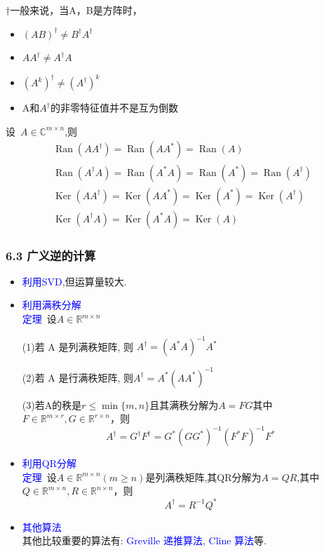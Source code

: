 \documentclass[notheorems,serif]{beamer}
\begin{document}
\begin{frame}
$\dagger$一般来说，当A，B是方阵时，
\begin{itemize}
	\item $(A B)^{\dagger} \neq B^{\dagger} A^{\dagger}$
	\item $A A^{\dagger} \neq A^{\dagger} A$
	\item $\left(A^{k}\right)^{\dagger} \neq\left(A^{\dagger}\right)^{k}$
	\item A和$A^{\dagger}$的非零特征值并不是互为倒数
\end{itemize}
设~$A \in \mathbb{C}^{m \times n}$,则
$$
\begin{array}{l}{\operatorname{Ran}\left(A A^{\dagger}\right)=\operatorname{Ran}\left(A A^{*}\right)=\operatorname{Ran}(A)} \\ {\operatorname{Ran}\left(A^{\dagger} A\right)=\operatorname{Ran}\left(A^{*} A\right)=\operatorname{Ran}\left(A^{*}\right)=\operatorname{Ran}\left(A^{\dagger}\right)} \\ {\operatorname{Ker}\left(A A^{\dagger}\right)=\operatorname{Ker}\left(A A^{*}\right)=\operatorname{Ker}\left(A^{*}\right)=\operatorname{Ker}\left(A^{\dagger}\right)} \\ {\operatorname{Ker}\left(A^{\dagger} A\right)=\operatorname{Ker}\left(A^{*} A\right)=\operatorname{Ker}(A)}\end{array}
$$
\end{frame}

\begin{frame}
\frametitle{6.3 广义逆的计算}
\begin{itemize}
	\item \textcolor{blue}{利用SVD},但运算量较大.
	\item \textcolor{blue}{利用满秩分解}\\
	
	\textcolor{blue}{定理}~设$A \in \mathbb{R}^{m \times n}$
	
	(1)若 A 是列满秩矩阵, 则 $A^{\dagger}=\left(A^{*} A\right)^{-1} A^{*}$
	
	(2)若 A 是行满秩矩阵, 则$A^{\dagger}=A^{*}\left(A A^{*}\right)^{-1}$
	
	(3)若A的秩是$r \leq \min \{m, n\}$且其满秩分解为$A=F G$其中$F \in \mathbb{R}^{m \times r}, G \in \mathbb{R}^{r \times n}$，则
		$$
		A^{\dagger}=G^{\dagger} F^{\dagger}=G^{*}\left(G G^{*}\right)^{-1}\left(F^{*} F\right)^{-1} F^{*}
		$$
\end{itemize}
\end{frame}

\begin{frame}
\begin{itemize}
	\item \textcolor{blue}{利用QR分解}\\
	\textcolor{blue}{定理}~设$A \in \mathbb{R}^{m \times n}(m \geq n)$是列满秩矩阵,其QR分解为$A=QR$,其中$Q \in \mathbb{R}^{m \times n}, R \in \mathbb{R}^{n \times n}$，则
	$$
	A^{\dagger}=R^{-1} Q^{*}
	$$
	\item \textcolor{blue}{其他算法}\\
	其他比较重要的算法有: \textcolor{blue}{Greville 递推算法, Cline 算法}等.
\end{itemize}
\end{frame}
\end{document}
